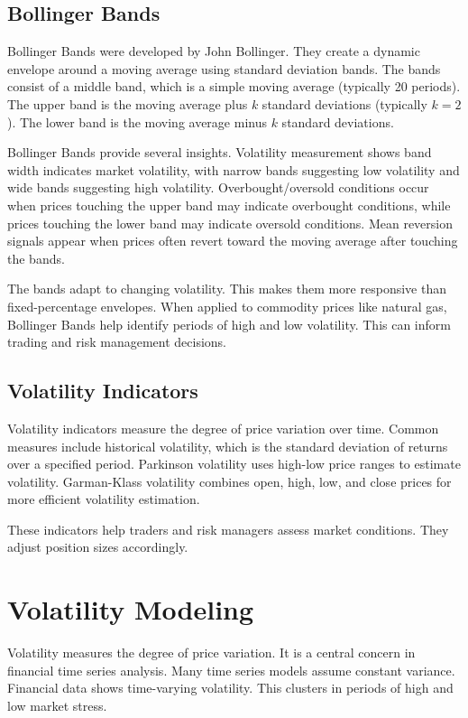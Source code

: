 \subsection{Bollinger Bands}

Bollinger Bands were developed by John Bollinger. They create a dynamic envelope around a moving average using standard deviation bands. The bands consist of a middle band, which is a simple moving average (typically 20 periods). The upper band is the moving average plus \(k\) standard deviations (typically \(k=2\)). The lower band is the moving average minus \(k\) standard deviations.

Bollinger Bands provide several insights. Volatility measurement shows band width indicates market volatility, with narrow bands suggesting low volatility and wide bands suggesting high volatility. Overbought/oversold conditions occur when prices touching the upper band may indicate overbought conditions, while prices touching the lower band may indicate oversold conditions. Mean reversion signals appear when prices often revert toward the moving average after touching the bands.

The bands adapt to changing volatility. This makes them more responsive than fixed-percentage envelopes. When applied to commodity prices like natural gas, Bollinger Bands help identify periods of high and low volatility. This can inform trading and risk management decisions.

\subsection{Volatility Indicators}

Volatility indicators measure the degree of price variation over time. Common measures include historical volatility, which is the standard deviation of returns over a specified period. Parkinson volatility uses high-low price ranges to estimate volatility. Garman-Klass volatility combines open, high, low, and close prices for more efficient volatility estimation.

These indicators help traders and risk managers assess market conditions. They adjust position sizes accordingly.

\section{Volatility Modeling}

Volatility measures the degree of price variation. It is a central concern in financial time series analysis. Many time series models assume constant variance. Financial data shows time-varying volatility. This clusters in periods of high and low market stress.

